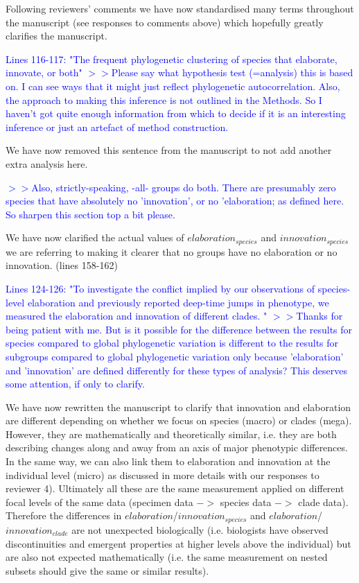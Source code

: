 \documentclass[12pt,letterpaper]{article}
\begin{document}
{Following reviewers’ comments we have now standardised many terms throughout the manuscript (see responses to comments above) which hopefully greatly clarifies the manuscript.

\textcolor{blue}{Lines 116-117: "The frequent phylogenetic clustering of species that elaborate, innovate, or both"
$>>$Please say what hypothesis test (=analysis) this is based on. I can see ways that it might just reflect phylogenetic autocorrelation. Also, the approach to making this inference is not outlined in the Methods. So I haven't got quite enough information from which to decide if it is an interesting inference or just an artefact of method construction.}

We have now removed this sentence from the manuscript to not add another extra analysis here.

\textcolor{blue}{$>>$Also, strictly-speaking, -all- groups do both. There are presumably zero species that have absolutely no 'innovation', or no 'elaboration; as defined here. So sharpen this section top a bit please.}

We have now clarified the actual values of $elaboration_{species}$ and $innovation_{species}$ we are referring to making it clearer that no groups have no elaboration or no innovation. (lines 158-162)

\textcolor{blue}{Lines 124-126: "To investigate the conflict implied by our observations of species-level elaboration and previously reported deep-time jumps in phenotype, we measured the elaboration and innovation of different clades. "
$>>$Thanks for being patient with me. But is it possible for the difference between the results for species compared to global phylogenetic variation is different to the results for subgroups compared to global phylogenetic variation only because 'elaboration' and 'innovation' are defined differently for these types of analysis? This deserves some attention, if only to clarify.}

We have now rewritten the manuscript to clarify that innovation and elaboration are different depending on whether we focus on species (macro) or clades (mega). However, they are mathematically and theoretically similar, i.e. they are both describing changes along and away from an axis of major phenotypic differences. In the same way, we can also link them to elaboration and innovation at the individual level (micro) as discussed in more details with our responses to reviewer 4). Ultimately all these are the same measurement applied on different focal levels of the same data (specimen data $->$ species data $->$ clade data). Therefore the differences in $elaboration$/$innovation_{species}$ and $elaboration$/$innovation_{clade}$ are not unexpected biologically (i.e. biologists have observed discontinuities and emergent properties at higher levels above the individual) but are also not expected mathematically (i.e. the same measurement on nested subsets should give the same or similar results).

}
\end{document}
